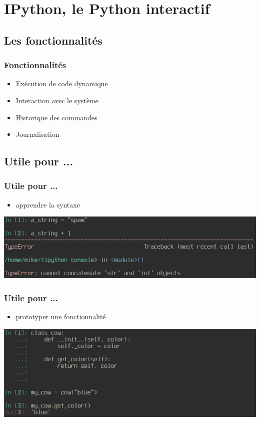 \section{IPython, le Python interactif}
\subsection{Les fonctionnalités}

\begin{frame}
  \frametitle{Fonctionnalités}
  \begin{itemize}
    \item Exécution de code dynamique
    \item Interaction avec le système
    \item Historique des commandes
    \item Journalisation 
  \end{itemize}
\end{frame}

\subsection{Utile pour ...}
\begin{frame}[fragile]
  \frametitle{Utile pour ...}
    \begin{itemize}
      \item apprendre la syntaxe
    \end{itemize}
  \includegraphics[scale=0.35]{apprendre.png}

\end{frame}

\begin{frame}
  \frametitle{Utile pour ...}
    \begin{itemize}
      \item prototyper une fonctionnalité
    \end{itemize}
  \includegraphics[scale=0.35]{prototype.png}
\end{frame}

